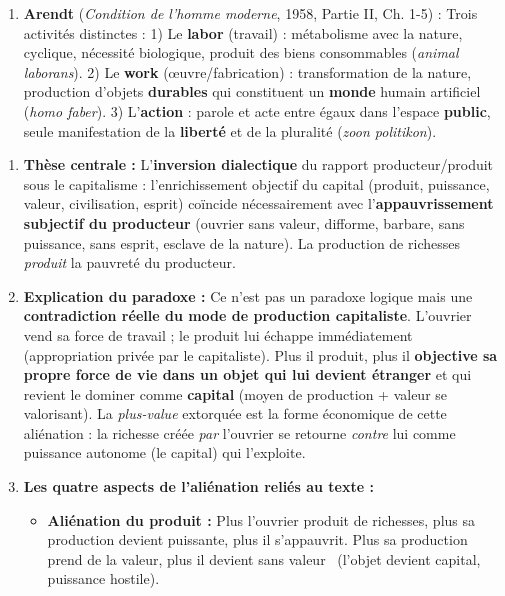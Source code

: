 \documentclass[11pt]{article}
\begin{document}
\begin{corrige}
\begin{enumerate}
\item \textbf{Arendt} (\emph{Condition de l'homme moderne}, 1958, Partie II, Ch. 1-5) : \guillemotleft Trois activités distinctes : 1) Le \textbf{labor} (travail) : métabolisme avec la nature, cyclique, nécessité biologique, produit des biens consommables (\emph{animal laborans}). 2) Le \textbf{work} (œuvre/fabrication) : transformation de la nature, production d'objets \textbf{durables} qui constituent un \textbf{monde} humain artificiel (\emph{homo faber}). 3) L'\textbf{action} : parole et acte entre égaux dans l'espace \textbf{public}, seule manifestation de la \textbf{liberté} et de la pluralité (\emph{zoon politikon}). \guillemotright
\end{enumerate}
\end{corrige}

\begin{corrige}
\begin{enumerate}
\item \textbf{Thèse centrale :} L'\textbf{inversion dialectique} du rapport producteur/produit sous le capitalisme : l'enrichissement objectif du capital (produit, puissance, valeur, civilisation, esprit) coïncide nécessairement avec l'\textbf{appauvrissement subjectif du producteur} (ouvrier sans valeur, difforme, barbare, sans puissance, sans esprit, esclave de la nature). La production de richesses \emph{produit} la pauvreté du producteur.
\item \textbf{Explication du paradoxe :} Ce n'est pas un paradoxe logique mais une \textbf{contradiction réelle du mode de production capitaliste}. L'ouvrier vend sa force de travail ; le produit lui échappe immédiatement (appropriation privée par le capitaliste). Plus il produit, plus il \textbf{objective sa propre force de vie dans un objet qui lui devient étranger} et qui revient le dominer comme \textbf{capital} (moyen de production + valeur se valorisant). La \emph{plus-value} extorquée est la forme économique de cette aliénation : la richesse créée \emph{par} l'ouvrier se retourne \emph{contre} lui comme puissance autonome (le capital) qui l'exploite.
\item \textbf{Les quatre aspects de l'aliénation reliés au texte :}
\begin{itemize}
\item \textbf{Aliénation du produit :} \guillemotleft Plus l'ouvrier produit de richesses, plus sa production devient puissante, plus il s'appauvrit. Plus sa production prend de la valeur, plus il devient sans valeur \guillemotright\ (l'objet devient capital, puissance hostile).

\end{itemize}
\end{enumerate}
\end{corrige}
\end{document}
